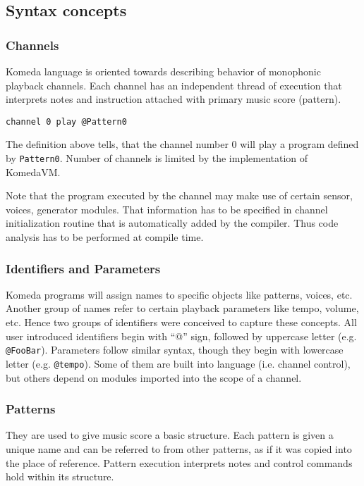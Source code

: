 \documentclass{article}
\begin{document}
\subsection{Syntax concepts}
\label{lang:concepts}

\subsubsection{Channels}
Komeda language is oriented towards describing behavior of monophonic playback
channels. Each channel has an independent thread of execution that interprets
notes and instruction attached with primary music score (pattern).

\begin{lstlisting}[caption=Channel notation example]
channel 0 play @Pattern0
\end{lstlisting}

The definition above tells, that the channel number 0 will play a program
defined by {\tt Pattern0}. Number of channels is limited by the implementation
of KomedaVM.

Note that the program executed by the channel may make use of certain sensor,
voices, generator modules. That information has to be specified in channel
initialization routine that is automatically added by the compiler. Thus code
analysis has to be performed at compile time. 

\subsubsection{Identifiers and Parameters}

Komeda programs will assign names to specific objects like patterns, voices,
etc. Another group of names refer to certain playback parameters like tempo,
volume, etc. Hence two groups of identifiers were conceived to capture these
concepts. All user introduced identifiers begin with “@” sign, followed by
uppercase letter (e.g. {\tt @FooBar}). Parameters follow similar syntax, though
they begin with lowercase letter (e.g. {\tt @tempo}). Some of them are built
into language (i.e. channel control), but others depend on modules imported
into the scope of a channel.

\subsubsection{Patterns}
They are used to give music score a basic structure. Each pattern is given a
unique name and can be referred to from other patterns, as if it was copied
into the place of reference. Pattern execution interprets notes and control
commands hold within its structure.
\end{document}

